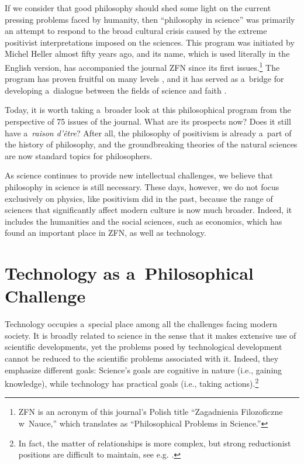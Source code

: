 If we consider that good philosophy should shed some light on the current pressing problems faced by humanity, then ``philosophy in science'' was primarily an attempt to respond to the broad cultural crisis caused by the extreme positivist interpretations imposed on the sciences. This program was initiated by Michel Heller almost fifty years ago, and its name, which is used literally in the English version, has accompanied the journal ZFN since its first issues.\footnote{ZFN is an acronym of this journal's Polish title ``Zagadnienia Filozoficzne w~Nauce,'' which translates as ``Philosophical Problems in Science.''} The program has proven fruitful on many levels 
\parencites[e.g][]{brozek_philosophy_2011}[][]{polak_oblicza_2017}, %
 and it has served as a~bridge for developing a~dialogue between the fields of science and faith 
\parencite[][]{polak_theory_2023}.%




Today, it is worth taking a~broader look at this philosophical program from the perspective of 75 issues of the journal. What are its prospects now? Does it still have a~\textit{raison d'être}? After all, the philosophy of positivism is already a~part of the history of philosophy, and the groundbreaking theories of the natural sciences are now standard topics for philosophers.



As science continues to provide new intellectual challenges, we believe that philosophy in science is still necessary. These days, however, we do not focus exclusively on physics, like positivism did in the past, because the range of sciences that significantly affect modern culture is now much broader. Indeed, it includes the humanities and the social sciences, such as economics, which has found an important place in ZFN, as well as technology.



\section{Technology as a~Philosophical Challenge}

Technology occupies a~special place among all the challenges facing modern society. It is broadly related to science in the sense that it makes extensive use of scientific developments, yet the problems posed by technological development cannot be reduced to the scientific problems associated with it. Indeed, they emphasize different goals: Science's goals are cognitive in nature (i.e., gaining knowledge), while technology has practical goals (i.e., taking actions).\footnote{In fact, the matter of relationships is more complex, but strong reductionist positions are difficult to maintain, see e.g. 
\parencite[][sec.2.1.-2.2.]{franssen_philosophy_2023}.%
}



